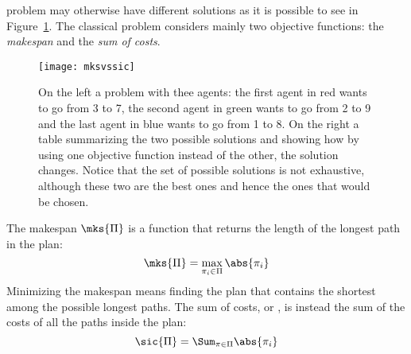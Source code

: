 problem may otherwise have different solutions as it is possible to see in
Figure~\ref{fig:mksvssic}. The classical problem considers mainly two objective
functions: the \textit{makespan} and the \textit{sum of costs}. 
\begin{figure}[t]
  \centering
  \begin{minipage}{0.38\linewidth}
    \texttt{[image: mksvssic]}
  \end{minipage}
  \hfill
  
  \caption{On the left a  problem with thee agents: the first agent
  in red wants to go from 3 to 7, the second agent in green wants to go from 2
  to 9 and the last agent in blue wants to go from 1 to 8. On the right a table
  summarizing the two possible solutions and showing how by using one objective
  function instead of the other, the solution changes. Notice that the set of
  possible solutions is not exhaustive, although these two are the best ones 
  and hence the ones that would be chosen.}
  \label{fig:mksvssic}
\end{figure}
\newline
The makespan $\mks{\Pi}$ is a function that returns the length of the longest
path in the plan:
\begin{equation}
  \mks{\Pi}=\max\limits_{\pi_i\in\Pi}\abs{\pi_i}
  \label{eq:mks}
\end{equation}
Minimizing the makespan means finding the plan that contains the shortest
among the possible longest paths. \newline
The sum of costs, or , is instead the sum of the costs of all the
paths inside the plan:
\begin{equation}
  \sic{\Pi}=\Sum_{\pi\in\Pi}\abs{\pi_i}
  \label{eq:sic}
\end{equation}
%
%
